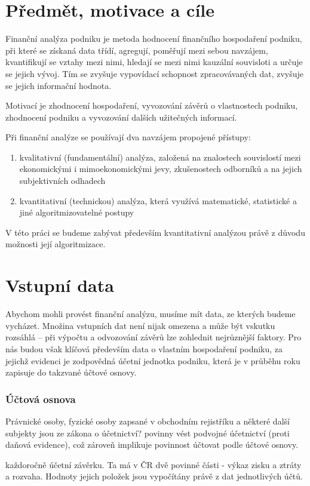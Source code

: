 \section{Předmět, motivace a cíle}
Finanční analýza podniku je metoda hodnocení finančního hospodaření podniku, při které se získaná data třídí, agregují, poměřují mezi sebou navzájem, kvantifikují se vztahy mezi nimi, hledají se mezi nimi kauzální souvisloti a určuje se jejich vývoj. Tím se zvyšuje vypovídací schopnost zpracovávaných dat, zvyšuje se jejich informační hodnota\cite{sedl}.

Motivací je zhodnocení hospodaření, vyvozování závěrů o vlastnostech podniku, zhodnocení podniku a vyvozování dalších užitečných informací.

Při finanční analýze se používají dva navzájem propojené přístupy\cite{kova}:
\begin{enumerate}
	\item kvalitativní (fundamentální) analýza, založená na znalostech souvislostí mezi ekonomickými i mimoekonomickými jevy, zkušenostech odborníků a na jejich subjektivních odhadech
	\item kvantitativní (technickou) analýza, která využívá matematické, statistické a jiné algoritmizovatelné postupy
\end{enumerate}
V této práci se budeme zabývat především kvantitativní analýzou právě z důvodu možnosti její algoritmizace. 

\section{Vstupní data}
Abychom mohli provést finanční analýzu, musíme mít data, ze kterých budeme vycházet. Množina vstupních dat není nijak omezena a může být vskutku rozsáhlá -- při výpočtu a odvozování závěrů lze zohlednit nejrůznější faktory. Pro nás budou však klíčová především data o vlastním hospodaření podniku, za jejichž evidenci je zodpovědná účetní jednotka podniku, která je v průběhu roku zapisuje do takzvané účtové osnovy.
\subsubsection{Účtová osnova}
Právnické osoby, fyzické osoby zapsané v obchodním rejistříku a některé další subjekty jsou ze zákona o účetnictví? povinny vést podvojné účetnictví (proti daňová evidence), což zároveň implikuje povinnost účtovat podle účtové osnovy.

každoročně účetní závěrku. Ta má v ČR dvě povinné části - výkaz zisku a ztráty a rozvaha. Hodnoty jejich položek jsou vypočítány právě z dat jednotlivých účtů.
